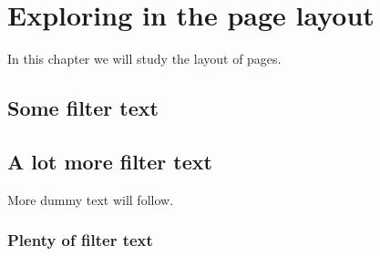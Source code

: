 \documentclass[a4paper,12pt]{book}
\begin{document}
  \tableofcontents
  \chapter{Exploring in the page layout}
    In this chapter we will study the layout of pages.
  \section{Some filter text}
  \blindtext
  \section{A lot more filter text}
    More dummy text will follow.
  \subsection{Plenty of filter text}
  \blindtext[10]
\end{document}
